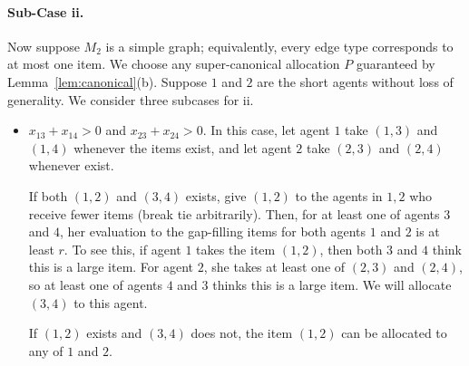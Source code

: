 \documentclass{article}
\theoremstyle{definition}
\begin{document}
\paragraph{Sub-Case ii.}
Now suppose $M_2$ is a simple graph; equivalently, every edge type corresponds to at most one item.
We choose any super-canonical allocation $P$ guaranteed by Lemma~\ref{lem:canonical}(b).
Suppose $1$ and $2$ are the short agents without loss of generality.
We consider three subcases for ii.
\begin{itemize}
    \item $x_{13}+x_{14}>0$ and $x_{23}+x_{24}>0$. In this case, let agent $1$ take $(1,3)$ and $(1,4)$ whenever the items exist, and let agent $2$ take $(2,3)$ and $(2,4)$ whenever exist. 
    
    If both $(1,2)$ and $(3,4)$ exists, give $(1,2)$ to the agents in $1,2$ who receive fewer items (break tie arbitrarily). Then, for at least one of agents $3$ and $4$, her evaluation to the gap-filling items for both agents $1$ and $2$ is at least $r$. To see this, if agent $1$ takes the item $(1,2)$, then both $3$ and $4$ think this is a large item. For agent $2$, she takes at least one of $(2,3)$ and $(2,4)$, so at least one of agents $4$ and $3$ thinks this is a large item.
    We will allocate $(3,4)$ to this agent.

    If $(1,2)$ exists and $(3,4)$ does not, the item $(1,2)$ can be allocated to any of $1$ and $2$.


\end{itemize}
\end{document}
